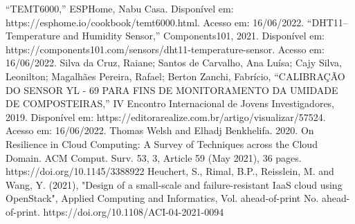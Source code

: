 \documentclass[conference]{IEEEtran}
\begin{document}
\begin{thebibliography}{00}
 ``TEMT6000,'' ESPHome, Nabu Casa. Disponível em: https://esphome.io/cookbook/temt6000.html. Acesso em: 16/06/2022.
 ``DHT11–Temperature and Humidity Sensor,'' Components101, 2021. Disponível em: https://components101.com/sensors/dht11-temperature-sensor. Acesso em: 16/06/2022.
 Silva da Cruz, Raiane; Santos de Carvalho, Ana Luísa; Cajy Silva, Leonilton; Magalhães Pereira, Rafael; Berton Zanchi, Fabrício, ``CALIBRAÇÃO DO SENSOR YL - 69 PARA FINS DE
MONITORAMENTO DA UMIDADE DE COMPOSTEIRAS,'' IV Encontro Internacional de Jovens Investigadores, 2019. Disponível em: https://editorarealize.com.br/artigo/visualizar/57524. Acesso em: 16/06/2022.
 Thomas Welsh and Elhadj Benkhelifa. 2020. On Resilience in Cloud Computing: A Survey of Techniques across the Cloud Domain. ACM Comput. Surv. 53, 3, Article 59 (May 2021), 36 pages. https://doi.org/10.1145/3388922
 Heuchert, S., Rimal, B.P., Reisslein, M. and Wang, Y. (2021), "Design of a small-scale and failure-resistant IaaS cloud using OpenStack", Applied Computing and Informatics, Vol. ahead-of-print No. ahead-of-print. https://doi.org/10.1108/ACI-04-2021-0094

\end{thebibliography}
\end{document}
